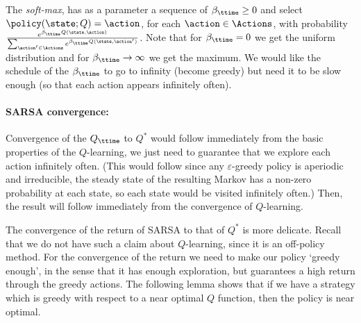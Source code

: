 The {\em soft-max}, has as a parameter a sequence of
$\beta_\ttime\geq 0$ and select $\policy(\state;Q)=\action$, for
each $\action \in \Actions$, with probability $\frac{e^{\beta_\ttime
Q(\state,\action)}}{\sum_{\action'\in \Actions}e^{\beta_\ttime
Q(\state,\action')}}$. Note that for $\beta_\ttime=0$ we get the
uniform distribution and for $\beta_\ttime\rightarrow \infty$ we get
the maximum. We would like the schedule of the $\beta_\ttime$ to go
to infinity (become greedy) but need it to be slow enough (so that
each action appears infinitely often).

\paragraph{SARSA convergence:}
Convergence of the $Q_\ttime$ to $Q^*$ would follow immediately from
the basic properties of the $Q$-learning, we just need to guarantee
that we explore each action infinitely often. (This would follow
since any $\varepsilon$-greedy policy is aperiodic and irreducible,
the steady state of the resulting Markov has a non-zero probability
at each state, so each state would be visited infinitely often.)
Then, the result will follow immediately from the convergence of
$Q$-learning.

The convergence of the return of SARSA to that of $Q^*$ is more
delicate. Recall that we do not have such a claim about
$Q$-learning, since it is an off-policy method. For the convergence
of the return we need to make our policy `greedy enough', in the
sense that it has enough exploration, but guarantees a high return
through the greedy actions. The following lemma shows that if we
have a strategy which is greedy with respect to a near optimal $Q$
function, then the policy is near optimal.

